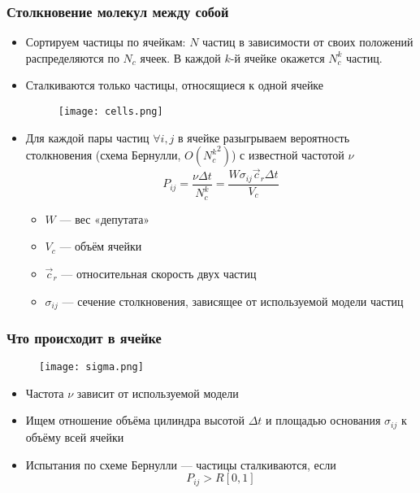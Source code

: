 \documentclass[onlymath]{beamer}
\begin{document}
\begin{frame}
  \frametitle{Столкновение молекул между собой}
  \begin{itemize}
  \item Сортируем частицы по ячейкам: $N$ частиц в зависимости от
    своих положений распределяются по $N_c$ ячеек. В каждой $k$-й
    ячейке окажется $N_c^k$ частиц.
  \item Сталкиваются только частицы, относящиеся к одной ячейке
    \begin{figure}
      \centering
      \texttt{[image: cells.png]}
    \end{figure}
  \item Для каждой пары частиц $\forall i, j$ в ячейке разыгрываем вероятность
    столкновения (схема Бернулли, $O({N_c^k}^2)$) с известной частотой $\nu$
    \begin{equation*}
      P_{ij} = \frac{\nu \Delta t}{N_c^k} = \frac{W\sigma_{ij}\vec{c}_r\Delta t}{V_c}
    \end{equation*}
    \begin{itemize}
    \item $W$ — вес «депутата»
    \item $V_c$ — объём ячейки
    \item $\vec{c}_r$ — относительная скорость двух частиц
    \item $\sigma_{ij}$ — сечение столкновения, зависящее от
      используемой модели частиц
    \end{itemize}
  \end{itemize}
\end{frame}

\begin{frame}
  \frametitle{Что происходит в ячейке}
  \begin{figure}
    \centering
    \texttt{[image: sigma.png]}
  \end{figure}
  \begin{itemize}
  \item Частота $\nu$ зависит от используемой модели
  \item Ищем отношение объёма цилиндра высотой $\Delta t$ и площадью
    основания $\sigma_{ij}$ к объёму всей ячейки
  \item Испытания по схеме Бернулли — частицы сталкиваются, если
    \begin{equation*}
      P_{ij} > R[0,1]
    \end{equation*}
  \end{itemize}
\end{frame}
\end{document}
